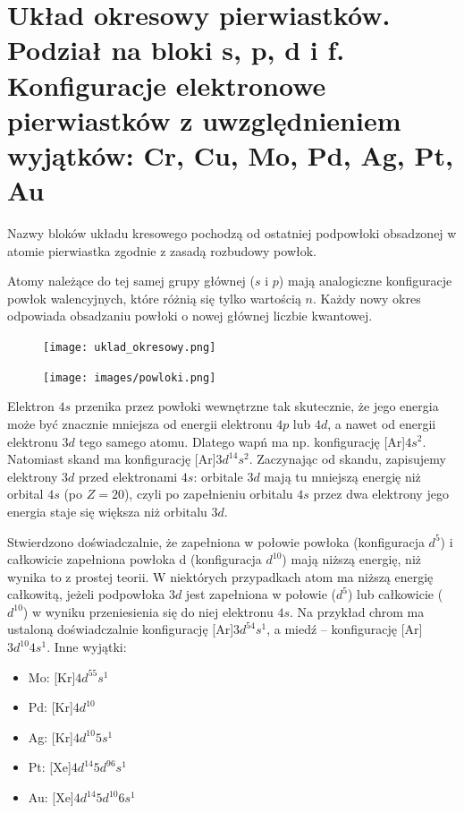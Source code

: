 \documentclass{article}
\begin{document}
\section{Układ okresowy pierwiastków. Podział na bloki s, p, d i f. Konfiguracje elektronowe pierwiastków z uwzględnieniem wyjątków: Cr, Cu, Mo, Pd, Ag, Pt, Au}
Nazwy bloków układu kresowego pochodzą od ostatniej podpowłoki obsadzonej w atomie pierwiastka zgodnie z zasadą rozbudowy powłok. 

Atomy należące do tej samej grupy głównej ($s$ i $p$) mają analogiczne konfiguracje powłok walencyjnych, które różnią się tylko wartością $n$. Każdy nowy okres odpowiada obsadzaniu powłoki o nowej głównej liczbie kwantowej. 

\begin{figure}[H]
    \centering
    \texttt{[image: uklad\_okresowy.png]}
\end{figure}

\begin{figure}[H]
    \centering
    \texttt{[image: images/powloki.png]}
\end{figure}
Elektron $4s$ przenika przez powłoki wewnętrzne tak skutecznie, że jego energia może być znacznie mniejsza od energii elektronu $4p$ lub $4d$, a nawet od energii elektronu $3d$ tego samego atomu. Dlatego wapń ma np. konfigurację [Ar]$4s^2$. Natomiast skand ma konfigurację [Ar]$3d^14s^2$. Zaczynając od skandu, zapisujemy elektrony $3d$ przed elektronami $4s$: orbitale $3d$ mają tu mniejszą energię niż orbital $4s$ (po $Z=20$), czyli po zapełnieniu orbitalu $4s$ przez dwa elektrony jego energia staje się większa niż orbitalu $3d$.

Stwierdzono doświadczalnie, że zapełniona w połowie powłoka (konfiguracja $d^5$) i całkowicie zapełniona powłoka  d (konfiguracja $d^10$) mają niższą energię, niż wynika to z prostej teorii. W niektórych przypadkach atom ma niższą energię całkowitą, jeżeli podpowłoka $3d$ jest zapełniona w połowie ($d^5$) lub całkowicie ($d^{10}$) w wyniku przeniesienia się do niej elektronu $4s$. Na przykład chrom ma ustaloną doświadczalnie konfigurację [Ar]$3d^54s^1$, a miedź -- konfigurację [Ar]$3d^{10}4s^1$.
Inne wyjątki:
\begin{itemize}
    \item Mo: [Kr]$4d^55s^1$
    \item Pd: [Kr]$4d^{10}$
    \item Ag: [Kr]$4d^{10}5s^1$
    \item Pt: [Xe]$4d^{14}5d^96s^1$
    \item Au: [Xe]$4d^{14}5d^{10}6s^1$
\end{itemize}
\end{document}
